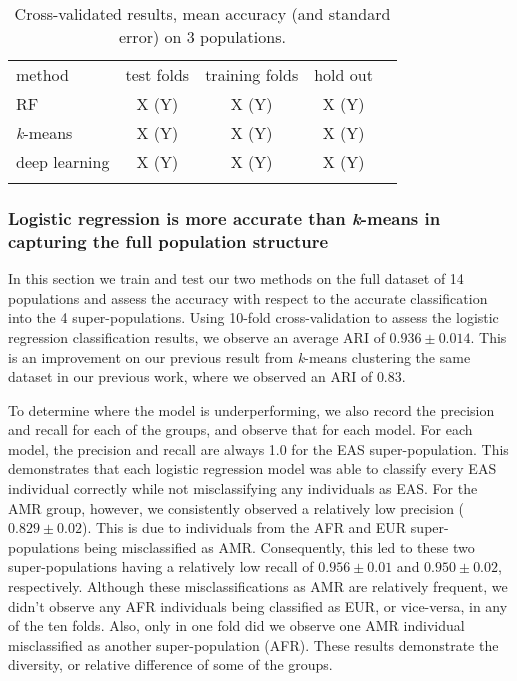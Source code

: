 \documentclass{llncs}
\newcommand{\kMeans}{\textit{k}-means}
\begin{document}
{%

\begin{table}
\caption{Cross-validated results, mean accuracy (and standard error) on 3 populations.}
\begin{center}
\renewcommand{\arraystretch}{1.4}
\setlength\tabcolsep{3pt}
\begin{tabular}{lcccc}
\hline\noalign{\smallskip}
method  & test folds & training folds & hold out \\
RF  & X (Y) & X (Y) & X (Y) \\
\kMeans & X (Y) & X (Y) & X (Y) \\
deep learning & X (Y) & X (Y) & X (Y) \\
\noalign{\smallskip}
\hline
\end{tabular}
\end{center}
\end{table}

\subsubsection{Logistic regression is more accurate than \kMeans{} in capturing the full population structure}
In this section we train and test our two methods on the full dataset of 14 populations and assess the accuracy with respect to the accurate classification into the 4 super-populations.
Using 10-fold cross-validation to assess the logistic regression classification results, we observe an average ARI of \(0.936 \pm{} 0.014\). This is an improvement on our previous result from \kMeans{} clustering the same dataset
in our previous work, where we observed an ARI of \(0.83\).

To determine where the model is underperforming, we also record the precision and recall for each of the groups, and observe that for each model. For each model, the precision and recall are always 1.0 for the EAS super-population.
This demonstrates that each logistic regression model was able to classify every EAS individual correctly while not misclassifying any individuals as EAS.
For the AMR group, however, we consistently observed a relatively low precision (\(0.829 \pm{} 0.02 \)). This is due to individuals from the AFR and EUR super-populations being misclassified as AMR. Consequently, this led to these two super-populations having a relatively low recall of \(0.956 \pm 0.01 \) and \(0.950 \pm 0.02 \), respectively.
Although these misclassifications as AMR are relatively frequent, we didn't observe any AFR individuals being classified as EUR, or vice-versa, in any of the ten folds. Also, only in one fold did we observe one AMR individual misclassified as another super-population (AFR).
These results demonstrate the diversity, or relative difference of some of the groups. 

}
\end{document}
